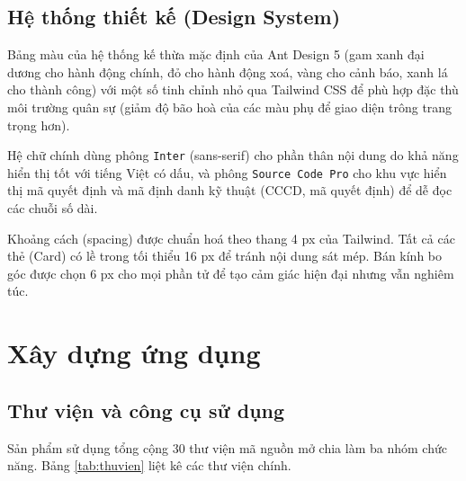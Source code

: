 \documentclass[../DoAn.tex]{subfiles}
\begin{document}
\subsection{Hệ thống thiết kế (Design System)}
\label{subsection:4.2.2}

Bảng màu của hệ thống kế thừa mặc định của Ant Design 5 (gam xanh đại dương cho hành động chính, đỏ cho hành động xoá, vàng cho cảnh báo, xanh lá cho thành công) với một số tinh chỉnh nhỏ qua Tailwind CSS để phù hợp đặc thù môi trường quân sự (giảm độ bão hoà của các màu phụ để giao diện trông trang trọng hơn).

Hệ chữ chính dùng phông \texttt{Inter} (sans-serif) cho phần thân nội dung do khả năng hiển thị tốt với tiếng Việt có dấu, và phông \texttt{Source Code Pro} cho khu vực hiển thị mã quyết định và mã định danh kỹ thuật (CCCD, mã quyết định) để dễ đọc các chuỗi số dài.

Khoảng cách (spacing) được chuẩn hoá theo thang 4 px của Tailwind. Tất cả các thẻ (Card) có lề trong tối thiểu 16 px để tránh nội dung sát mép. Bán kính bo góc được chọn 6 px cho mọi phần tử để tạo cảm giác hiện đại nhưng vẫn nghiêm túc.

\section{Xây dựng ứng dụng}
\label{section:4.3}

\subsection{Thư viện và công cụ sử dụng}
\label{subsection:4.3.1}

Sản phẩm sử dụng tổng cộng 30 thư viện mã nguồn mở chia làm ba nhóm chức năng. Bảng \ref{tab:thuvien} liệt kê các thư viện chính.
\end{document}
